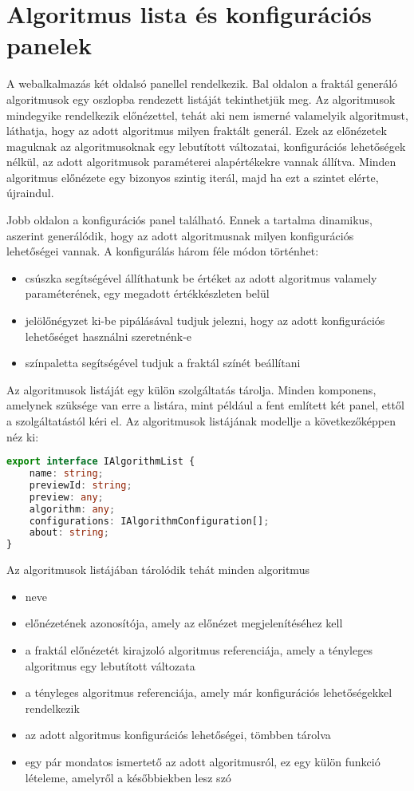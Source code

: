 \section*{Algoritmus lista és konfigurációs panelek}
A webalkalmazás két oldalsó panellel rendelkezik. Bal oldalon a fraktál generáló algoritmusok egy oszlopba rendezett listáját tekinthetjük meg. Az algoritmusok mindegyike rendelkezik előnézettel, tehát aki nem ismerné valamelyik algoritmust, láthatja, hogy az adott algoritmus milyen fraktált generál. Ezek az előnézetek maguknak az algoritmusoknak egy lebutított változatai, konfigurációs lehetőségek nélkül, az adott algoritmusok paraméterei alapértékekre vannak állítva. Minden algoritmus előnézete egy bizonyos szintig iterál, majd ha ezt a szintet elérte, újraindul. 
\par Jobb oldalon a konfigurációs panel található. Ennek a tartalma dinamikus, aszerint generálódik, hogy az adott algoritmusnak milyen konfigurációs lehetőségei vannak. A konfigurálás három féle módon történhet:
\begin{itemize}
	\item  csúszka segítségével állíthatunk be értéket az adott algoritmus valamely paraméterének, egy megadott értékkészleten belül
	\item jelölőnégyzet ki-be pipálásával tudjuk jelezni, hogy az adott konfigurációs lehetőséget használni szeretnénk-e
	\item színpaletta segítségével tudjuk a fraktál színét beállítani
\end{itemize}
\par Az algoritmusok listáját egy külön szolgáltatás tárolja. Minden komponens, amelynek szüksége van erre a listára, mint például a fent említett két panel, ettől a szolgáltatástól kéri el. Az algoritmusok listájának modellje a következőképpen néz ki:
\begin{lstlisting}[language=typescript]
export interface IAlgorithmList {
	name: string;
	previewId: string;
	preview: any;
	algorithm: any;
	configurations: IAlgorithmConfiguration[];
	about: string;
}
\end{lstlisting}
Az algoritmusok listájában tárolódik tehát minden algoritmus
\begin{itemize}
	\item neve
	\item előnézetének azonosítója, amely az előnézet megjelenítéséhez kell
	\item a fraktál előnézetét kirajzoló algoritmus referenciája, amely a tényleges algoritmus egy lebutított változata
	\item a tényleges algoritmus referenciája, amely már konfigurációs lehetőségekkel rendelkezik
	\item az adott algoritmus konfigurációs lehetőségei, tömbben tárolva
	\item egy pár mondatos ismertető az adott algoritmusról, ez egy külön funkció lételeme, amelyről a későbbiekben lesz szó
\end{itemize}
